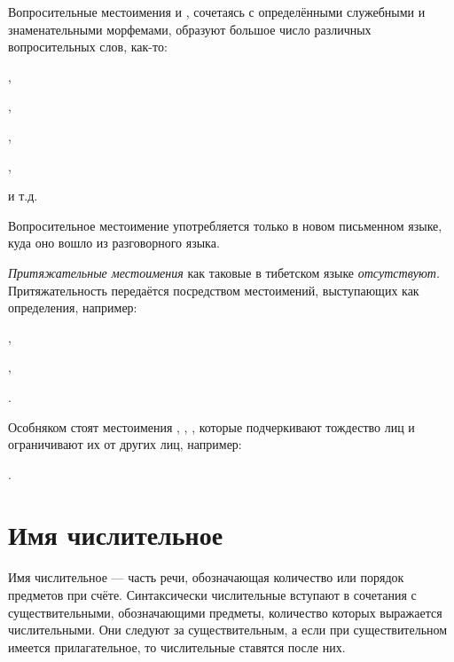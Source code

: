 Вопросительные местоимения  и , сочетаясь с определёнными служебными и знаменательными морфемами, образуют большое число различных вопросительных слов, как-то:
\begin{prfsample}
    \item {},
    \item {},
    \item {},
    \item {},
    \item {}
\end{prfsample}
и т.д.

Вопросительное местоимение  употребляется только в новом письменном языке, куда оно вошло из разговорного языка.

\emph{Притяжательные местоимения} как таковые в тибетском языке \emph{отсутствуют}. Притяжательность передаётся посредством местоимений, выступающих как определения, например:
\begin{prfsample}
    \item {},
    \item {},
    \item {}.
\end{prfsample}

Особняком стоят местоимения , , , которые подчеркивают тождество лиц и ограничивают их от других лиц, например:
\begin{prfsample}
    \item {}.    
\end{prfsample}

\section{Имя числительное}

Имя числительное --- часть речи, обозначающая количество или порядок предметов при счёте. Синтаксически числительные вступают в сочетания с существительными, обозначающими предметы, количество которых выражается числительными. Они следуют за существительным, а если при существительном имеется прилагательное, то числительные ставятся после них.

